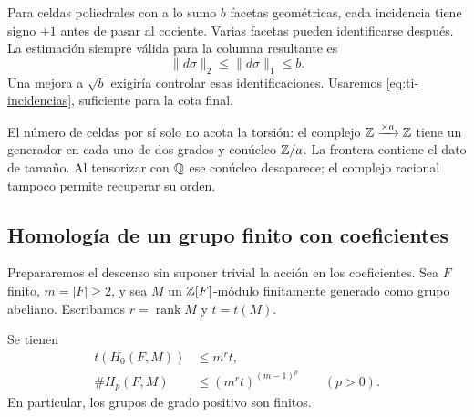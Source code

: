 Para celdas poliedrales con a lo sumo $b$ facetas geométricas,
cada incidencia tiene signo $\pm1$ antes de pasar al cociente.
Varias facetas pueden identificarse después. La estimación
siempre válida para la columna resultante es
\begin{equation}
 \|d\sigma\|_2\le\|d\sigma\|_1\le b.
 \label{eq:ti-incidencias}
\end{equation}
Una mejora a $\sqrt b$ exigiría controlar esas identificaciones.
Usaremos \eqref{eq:ti-incidencias}, suficiente para la cota final.

El número de celdas por sí solo no acota la torsión: el complejo
$\mathbb{Z}\xrightarrow{\times a}\mathbb{Z}$ tiene un generador en cada uno
de dos grados y conúcleo $\mathbb{Z}/a$. La frontera contiene el dato
de tamaño. Al tensorizar con $\mathbb{Q}$ ese conúcleo desaparece;
el complejo racional tampoco permite recuperar su orden.

\subsection{Homología de un grupo finito con coeficientes}

Prepararemos el descenso sin suponer trivial la acción en los
coeficientes. Sea $F$ finito, $m=|F|\ge2$, y sea $M$ un
$\mathbb{Z}[F]$-módulo finitamente generado como grupo abeliano.
Escribamos $r=\operatorname{rank}M$ y $t=t(M)$.

\begin{proposicion}
\label{prop:ti-grupo-finito}
Se tienen
\begin{equation}
 \begin{aligned}
 t(H_0(F,M))&\le m^r t,\\
 \#H_p(F,M)&\le(m^r t)^{(m-1)^p}\qquad(p>0).
 \end{aligned}
 \label{eq:ti-grupo-finito}
\end{equation}
En particular, los grupos de grado positivo son finitos.
\end{proposicion}

